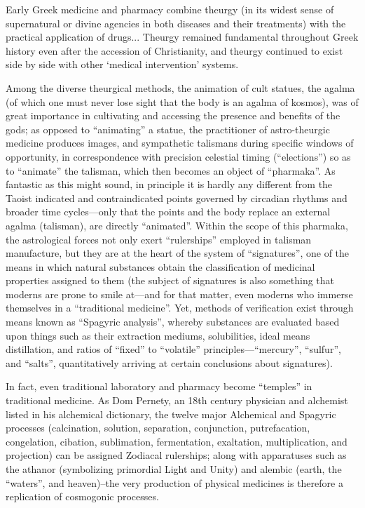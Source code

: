 \begin{quotex}
Early Greek medicine and pharmacy combine theurgy (in its widest sense of supernatural or divine agencies in both diseases and their treatments) with the practical application of drugs... Theurgy remained fundamental throughout Greek history even after the accession of Christianity, and theurgy continued to exist side by side with other `medical intervention' systems.
\end{quotex}


Among the diverse theurgical methods, the animation of cult statues, the agalma (of which one must never lose sight that the body is an agalma of kosmos), was of great importance in cultivating and accessing the presence and benefits of the gods; as opposed to ``animating'' a statue, the practitioner of astro-theurgic medicine produces images, and sympathetic talismans during specific windows of opportunity, in correspondence with precision celestial timing (``elections'') so as to ``animate'' the talisman, which then becomes an object of ``pharmaka''. As fantastic as this might sound, in principle it is hardly any different from the Taoist indicated and contraindicated points governed by circadian rhythms and broader time cycles---only that the points and the body replace an external agalma (talisman), are directly ``animated''. Within the scope of this pharmaka, the astrological forces not only exert ``rulerships'' employed in talisman manufacture, but they are at the heart of the system of ``signatures'', one of the means in which natural substances obtain the classification of medicinal properties assigned to them (the subject of signatures is also something that moderns are prone to smile at---and for that matter, even moderns who immerse themselves in a ``traditional medicine''. Yet, methods of verification exist through means known as ``Spagyric analysis'', whereby substances are evaluated based upon things such as their extraction mediums, solubilities, ideal means distillation, and ratios of ``fixed'' to ``volatile'' principles---``mercury'', ``sulfur'', and ``salts'', quantitatively arriving at certain conclusions about signatures).

In fact, even traditional laboratory and pharmacy become ``temples'' in traditional medicine. As Dom Pernety, an 18th century physician and alchemist listed in his alchemical dictionary, the twelve major Alchemical and Spagyric processes (calcination, solution, separation, conjunction, putrefacation, congelation, cibation, sublimation, fermentation, exaltation, multiplication, and projection) can be assigned Zodiacal rulerships; along with apparatuses such as the athanor (symbolizing primordial Light and Unity) and alembic (earth, the ``waters'', and heaven)--the very production of physical medicines is therefore a replication of cosmogonic processes.

